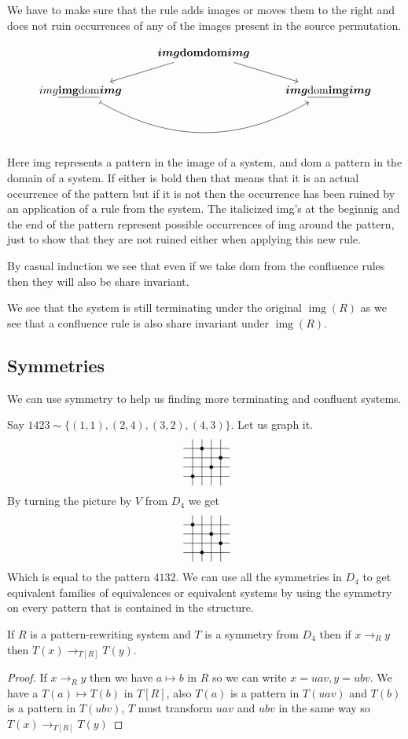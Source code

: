 \documentclass[a4paper, 11pt, english]{article}
\newcommand{\pattern}[4]{
  \raisebox{0.6ex}{
  \begin{tikzpicture}[scale=0.3, baseline=(current bounding box.center), #1]
    \foreach \x/\y in {#4}
      \fill[NE-lines] (\x,\y) rectangle +(1,1);
    \draw (0.01,0.01) grid (#2+0.99,#2+0.99);
    \foreach \x/\y in {#3}
      \filldraw (\x,\y) circle (5pt);
  \end{tikzpicture}}
}
\newcommand{\patternrule}{ \mapsto \!}
\theoremstyle{definition}
\DeclareMathOperator{\img}{img}
\begin{document}
We have to make sure that the rule adds images or moves them to the right and does not ruin
occurrences of any of the images present in the source permutation.

\[
\begin{tikzcd}  
    & \bm{img}\mathbf{domdom}\bm{img} \arrow[dl] \arrow[dr] & \\
    img\underline{\mathbf{img}\mathrm{dom}}\bm{img} \arrow[bend
    right=30, mapsto]{rr} & & \bm{img}\underline{\mathrm{dom}\mathbf{img}}\bm{img}
\end{tikzcd}
\]

Here img represents a pattern in the image of a system, and dom a pattern in the domain of a system.
If either is bold then that means that it is an actual occurrence of the pattern but if it is not
then the occurrence has been ruined by an application of a rule from the system. The italicized
img's at the beginnig and the end of the pattern represent possible occurrences of img around the
pattern, just to show that they are not ruined either when applying this new rule.

By casual induction we see that even if we take dom from the confluence rules
then they will also be share invariant.

We see that the system is still terminating under the original $\img(R)$ as we see
that a confluence rule is also share invariant under $\img(R)$.

\subsection{Symmetries}
We can use symmetry to help us finding more terminating and confluent systems. 

Say $1423 \sim \{(1,1), (2,4), (3,2), (4,3)\}$. Let us graph it.
%
\[
\pattern{}{4}{1/1, 2/4, 3/2, 4/3}{}
\]
By turning the picture by $V$ from $D_4$ we get
\[
\pattern{}{4}{1/4, 2/1, 3/3, 4/2}{}
\]
Which is equal to the pattern $4132$.
We can use all the symmetries in $D_4$ to get equivalent families of equivalences or equivalent
systems by using the symmetry on every pattern that is contained in the structure.

\begin{sublemma}
    If $R$ is a pattern-rewriting system and $T$ is a symmetry from $D_4$ then if
    $x \to_R y$ then $T(x) \to_{T[R]} T(y)$.
\end{sublemma}
\begin{proof}
    If $x \to_R y$ then we have $a \patternrule b$ in $R$ so we can write $x = u a v, y = u b v$. We
    have a $T(a) \patternrule T(b)$ in $T[R]$, also $T(a)$ is a pattern in $T(u a v)$ and $T(b)$ is
    a pattern in $T(u b v)$, $T$ must transform $uav$ and $ubv$ in the same way so $T(x) \to_{T[R]}
    T(y)$
\end{proof}
\end{document}
